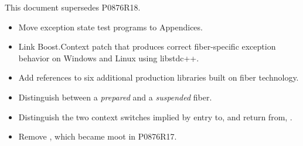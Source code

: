 \label{history}
This document supersedes P0876R18.


\begin{itemize}
    \item Move exception state test programs to Appendices.
    \item Link Boost.Context patch that produces correct fiber-specific
          exception behavior on Windows and Linux using libstdc++.
    \item Add references to six additional production libraries built on fiber
          technology.
\end{itemize}


\begin{itemize}
    \item Distinguish between a \emph{prepared} and a \emph{suspended} fiber.
    \item Distinguish the two context switches implied by entry to, and return
          from, \resumewith.
    \item Remove , which became moot
          in P0876R17.
\end{itemize}


